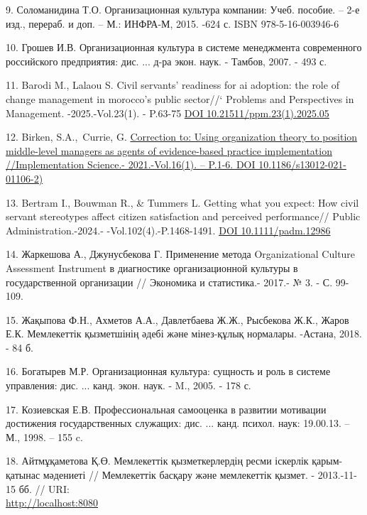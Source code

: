 \begin{references}
9. Соломанидина Т.О. Организационная культура компании: Учеб. пособие.
-- 2-е изд., перераб. и доп. -- М.: ИНФРА-М, 2015. -624 с. ISBN
978-5-16-003946-6

10. Грошев И.В. Организационная культура в системе менеджмента
современного российского предприятия: дис. ... д-ра экон. наук. -
Тамбов, 2007. - 493 с.

11. Barodi M., Lalaou S. Civil servants' readiness for ai adoption: the
role of change management in morocco's public sector//` Problems and
Perspectives in Management. -2025.-Vol.23(1). - P.63-75
\href{http://dx.doi.org/10.21511/ppm.23(1).2025.05}{DOI
10.21511/ppm.23(1).2025.05}

12. Birken, S.A.,~Currie, G.
\href{https://www.scopus.com/record/display.uri?eid=2-s2.0-85104625356&origin=reflist&sort=plf-f&src=s&sid=9294c12779ee47479a1a0997e8991897&sot=b&sdt=b&sl=99&s=TITLE\%28An+Examination+of+Civil+Servants\%e2\%80\%99+Assessment+of++the+New+Civil+Service+Reforms+in+Kazakhstan\%29}{Correction
to: Using organization theory to position middle-level managers as
agents of evidence-based practice implementation //Implementation
Science.- 2021.-Vol.16(1). -- P.1-6. DOI 10.1186/s13012-021-01106-2)}

13. Bertram I., Bouwman R., \& Tummers L. Getting what you expect: How
civil servant stereotypes affect citizen satisfaction and perceived
performance// Public Administration.-2024.- -Vol.102(4).-P.1468-1491.
\href{https://doi.org/10.1111/padm.12986}{DOI 10.1111/padm.12986}

14. Жаркешова А., Джунусбекова Г. Применение метода Organizational
Culture Assessment Instrument в диагностике организационной культуры в
государственной организации // Экономика и статистика.- 2017.- № 3. - С.
99-109.

15. Жақыпова Ф.Н., Ахметов А.А., Давлетбаева Ж.Ж., Рысбекова Ж.К., Жаров
Е.К. Мемлекеттік қызметшінің әдебі және мінез-құлық нормалары. -Астана,
2018. - 84 б.

16. Богатырев М.Р. Организационная культура: сущность и роль в системе
управления: дис. ... канд. экон. наук. - M., 2005. - 178 с.

17. Козиевская Е.В. Профессиональная самооценка в развитии мотивации
достижения государственных служащих: дис. ... канд. психол. наук:
19.00.13. -- М., 1998. -- 155 c.

18. Айтмұқаметова Қ.Ө. Мемлекеттік қызметкерлердің ресми іскерлік
қарым-қатынас мәдениеті // Мемлекеттік басқару және мемлекеттік қызмет.
- 2013.-11-15 бб. //
URI:\\\href{http://localhost:8080/xmlui/handle/123456789/1020}{http://localhost:8080}


\end{references}
